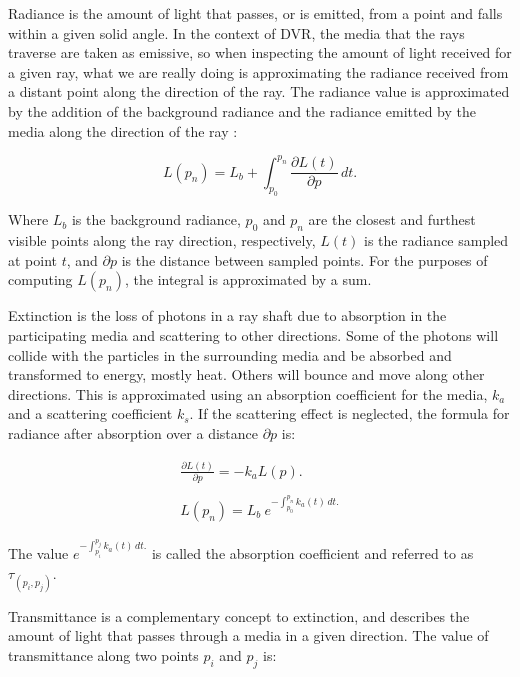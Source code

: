\documentclass[oneside,a4paper,english,links]{amca}
\begin{document}
Radiance is the amount of light that passes, or is emitted, from a
point and falls within a given solid angle. In the context of DVR, the
media that the rays traverse are taken as emissive, so when inspecting
the amount of light received for a given ray, what we are really doing
is approximating the radiance received from a distant point along the
direction of the ray. The radiance value is approximated by the
addition of the background radiance and the radiance emitted by the
media along the direction of the ray \citep{Kratz2006} : 

\begin{equation} \label{eq:general_radiance}  
  L(p_n) = L_b + \int_{p_0}^{p_n} \frac{\partial L(t)}{\partial p} \, dt.
\end{equation}

Where $L_b$ is the background radiance, $p_0$ and $p_n$ are the
closest and furthest visible points along the ray direction,
respectively, $L(t)$ is the radiance sampled at point $t$, and
$\partial p$ is the distance between sampled points. For the purposes
of computing $L(p_n)$, the integral is approximated by a sum.

Extinction is the loss of photons in a ray shaft due to absorption in
the participating media and scattering to other directions. Some of
the photons will collide with the particles in the
surrounding media and be absorbed and transformed to energy, mostly
heat. Others will bounce and move along other directions. This is
approximated using an absorption coefficient for the media, $k_a$ and
a scattering coefficient $k_s$. If the scattering effect is neglected,
the formula for radiance after absorption over a distance $\partial p$
is:

\begin{equation} \label{eq:absorption_radiance}  
  \begin{aligned}
    \frac{\partial L(t)}{\partial p} = -k_a L(p). 
    \\
    \\
    L(p_n) = L_b \ e^{-\int_{p_0}^{p_n} k_a(t) \, dt.}
  \end{aligned}
\end{equation}

The value $e^{-\int_{p_i}^{p_j} k_a(t) \, dt.}$ is called the
absorption coefficient and referred to as $\tau_{(p_i, p_j)}$.

Transmittance is a complementary concept to extinction, and describes
the amount of light that passes through a media in a given
direction. The value of transmittance along two points $p_i$ and $p_j$
is:
\end{document}

